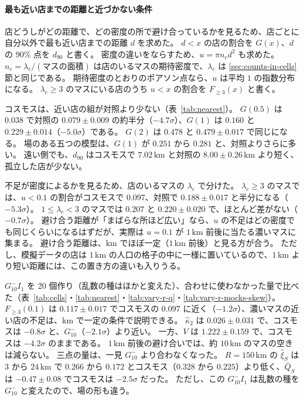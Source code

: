 \documentclass[a4paper,11pt]{ltjsarticle}
\begin{document}
\paragraph{最も近い店までの距離と近づかない条件}
\label{sec:inhibition}
店どうしがどの距離で、どの密度の所で避け合っているかを見るため、店ごとに自分以外で最も近い店までの距離 $d$ を求めた。
$d < x$ の店の割合を $G(x)$、$d$ の $90\%$ 点を $d_{90}$ と書く。
密度の違いをならすため、$u = \pi n_c d^2$ も求めた。
$n_c = \lambda_c / (\text{マスの面積})$ は店のいるマスの期待密度で、$\lambda_c$ は \ref{sec:counts-in-cells} 節と同じである。
期待密度のとおりのポアソン点なら、$u$ は平均 $1$ の指数分布になる。
$\lambda_c \ge 3$ のマスにいる店のうち $u < x$ の割合を $F_{\ge 3}(x)$ と書く。

コスモスは、近い店の組が対照より少ない（表~\ref{tab:nearest}）。
$G(0.5)$ は $0.038$ で対照の $0.079 \pm 0.009$ の約半分（$-4.7\sigma$）、$G(1)$ は $0.160$ と $0.229 \pm 0.014$（$-5.0\sigma$）である。
$G(2)$ は $0.478$ と $0.479 \pm 0.017$ で同じになる。
場のある五つの模型は、$G(1)$ が $0.251$ から $0.281$ と、対照よりさらに多い。
遠い側でも、$d_{90}$ はコスモスで $7.02\,\mathrm{km}$ と対照の $8.00 \pm 0.26\,\mathrm{km}$ より短く、孤立した店が少ない。

不足が密度によるかを見るため、店のいるマスの $\lambda_c$ で分けた。
$\lambda_c \ge 3$ のマスでは、$u < 0.1$ の割合がコスモスで $0.097$、対照で $0.188 \pm 0.017$ と半分になる（$-5.3\sigma$）。
$1 \le \lambda_c < 3$ のマスでは $0.207$ と $0.220 \pm 0.020$ で、ほとんど差がない（$-0.7\sigma$）。
避け合う距離が「まばらな所ほど広い」なら、$u$ の不足はどの密度でも同じくらいになるはずだが、実際は $u = 0.1$ が $1\,\mathrm{km}$ 前後に当たる濃いマスに集まる。
避け合う距離は、$\mathrm{km}$ でほぼ一定（$1\,\mathrm{km}$ 前後）と見る方が合う。
ただし、模擬データの店は $1\,\mathrm{km}$ の人口の格子の中に一様に置いているので、$1\,\mathrm{km}$ より短い距離には、この置き方の違いも入りうる。

$G_{10}^{-}I_1$ を 20 個作り（乱数の種はほかと変えた）、合わせに使わなかった量で比べた（表~\ref{tab:cells}・\ref{tab:nearest}・\ref{tab:vary-r-q}・\ref{tab:vary-r-mocks-skew}）。
$F_{\ge 3}(0.1)$ は $0.117 \pm 0.017$ でコスモスの $0.097$ に近く（$-1.2\sigma$）、濃いマスの近い店の不足は、$\mathrm{km}$ で一定の条件で説明できる。
$\hat\kappa_2$ は $0.026 \pm 0.031$ で、コスモスは $-0.8\sigma$ と、$G_{10}^{-}$（$-2.1\sigma$）より近い。
一方、$V$ は $1.222 \pm 0.159$ で、コスモスは $-4.2\sigma$ のままである。
$1\,\mathrm{km}$ 前後の避け合いでは、約 $10\,\mathrm{km}$ のマスの空きは減らない。
三点の量は、一見 $G_{10}^{-}$ より合わなくなった。
$R = 150\,\mathrm{km}$ の $\hat\xi_S$ は $3$ から $24\,\mathrm{km}$ で $0.266$ から $0.172$ とコスモス（$0.328$ から $0.225$）より低く、$\bar Q_S$ は $-0.47 \pm 0.08$ でコスモスは $-2.5\sigma$ だった。
ただし、この $G_{10}^{-}I_1$ は乱数の種を $G_{10}^{-}$ と変えたので、場の形も違う。
\end{document}
